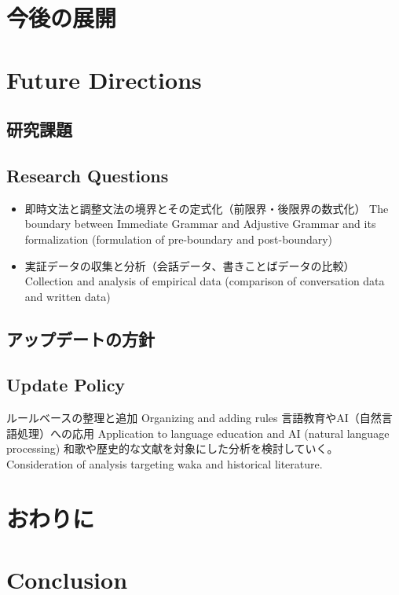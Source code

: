 \documentclass[a4paper,xelatex,ja=standard]{bxjsarticle}
\begin{document}
\ifJPN
  \section{今後の展開}
\else
  \section{Future Directions}
\fi

\ifJPN
  \subsection{研究課題}
\else
  \subsection{Research Questions}
\fi

\begin{itemize}
  \item 
\ifJPN
即時文法と調整文法の境界とその定式化（前限界・後限界の数式化）
\else
The boundary between Immediate Grammar and Adjustive Grammar and its formalization (formulation of pre-boundary and post-boundary)
\fi

  \item 
\ifJPN
実証データの収集と分析（会話データ、書きことばデータの比較）
\else
Collection and analysis of empirical data (comparison of conversation data and written data)
\fi
\end{itemize}

\ifJPN
  \subsection{アップデートの方針}
\else
  \subsection{Update Policy}
\fi

\ifJPN
ルールベースの整理と追加
\else
Organizing and adding rules
\fi
\ifJPN
言語教育やAI（自然言語処理）への応用
\else
Application to language education and AI (natural language processing)
\fi
\ifJPN
和歌や歴史的な文献を対象にした分析を検討していく。
\else
Consideration of analysis targeting waka and historical literature.
\fi

\ifJPN
  \section{おわりに}
\else
  \section{Conclusion}
\fi
\end{document}
